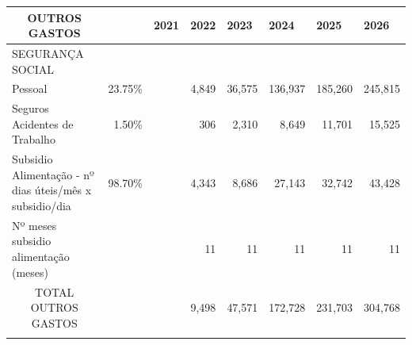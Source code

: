 \documentclass[11pt]{article}
\begin{document}
	\small
	\begin{adjustbox}{center}
		\begin{tabular}{lllrrrrr}
			\hline
			\multicolumn{1}{|c|}{OUTROS GASTOS}                                           & \multicolumn{1}{l|}{}        & \multicolumn{1}{l|}{2021} & \multicolumn{1}{l|}{2022}   & \multicolumn{1}{l|}{2023}    & \multicolumn{1}{l|}{2024}    & \multicolumn{1}{l|}{2025}      & \multicolumn{1}{l|}{2026}      \\ \hline
			\multicolumn{1}{|l|}{SEGURANÇA SOCIAL}                                        & \multicolumn{1}{l|}{}        & \multicolumn{1}{r|}{}     & \multicolumn{1}{r|}{}       & \multicolumn{1}{r|}{}        & \multicolumn{1}{r|}{}        & \multicolumn{1}{r|}{}          & \multicolumn{1}{l|}{}          \\ \hline
			\multicolumn{1}{|l|}{Pessoal}                                                 & \multicolumn{1}{r|}{23.75\%} & \multicolumn{1}{r|}{}     & \multicolumn{1}{r|}{4,849}  & \multicolumn{1}{r|}{36,575}  & \multicolumn{1}{r|}{136,937} & \multicolumn{1}{r|}{185,260}   & \multicolumn{1}{r|}{245,815}   \\ \hline
			\multicolumn{1}{|l|}{Seguros Acidentes de Trabalho}                           & \multicolumn{1}{r|}{1.50\%}  & \multicolumn{1}{r|}{}     & \multicolumn{1}{r|}{306}    & \multicolumn{1}{r|}{2,310}   & \multicolumn{1}{r|}{8,649}   & \multicolumn{1}{r|}{11,701}    & \multicolumn{1}{r|}{15,525}    \\ \hline
			\multicolumn{1}{|l|}{Subsidio Alimentação - nº dias úteis/mês x subsidio/dia} & \multicolumn{1}{r|}{98.70\%} & \multicolumn{1}{l|}{}     & \multicolumn{1}{r|}{4,343}  & \multicolumn{1}{r|}{8,686}   & \multicolumn{1}{r|}{27,143}  & \multicolumn{1}{r|}{32,742}    & \multicolumn{1}{r|}{43,428}    \\ \hline
			\multicolumn{1}{|l|}{Nº meses subsidio alimentação (meses)}                   & \multicolumn{1}{l|}{}        & \multicolumn{1}{l|}{}     & \multicolumn{1}{r|}{11}     & \multicolumn{1}{r|}{11}      & \multicolumn{1}{r|}{11}      & \multicolumn{1}{r|}{11}        & \multicolumn{1}{r|}{11}        \\ \hline
			\multicolumn{1}{|c|}{TOTAL OUTROS GASTOS}                                     & \multicolumn{1}{l|}{}        & \multicolumn{1}{l|}{}     & \multicolumn{1}{r|}{9,498}  & \multicolumn{1}{r|}{47,571}  & \multicolumn{1}{r|}{172,728} & \multicolumn{1}{r|}{231,703}   & \multicolumn{1}{r|}{304,768}   \\ \hline
			\multicolumn{1}{c}{}                                                          &                              &                           & \multicolumn{1}{l}{}        & \multicolumn{1}{l}{}         & \multicolumn{1}{l}{}         & \multicolumn{1}{l}{}           & \multicolumn{1}{l}{}           \\ \hline

\end{tabular}
\end{adjustbox}
\end{document}
